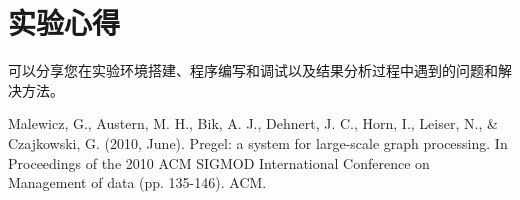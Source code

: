 \documentclass{ML}
\begin{document}
\section{实验心得}
可以分享您在实验环境搭建、程序编写和调试以及结果分析过程中遇到的问题和解决方法。
\appendix

\begin{thebibliography}{20}
     Malewicz, G., Austern, M. H., Bik, A. J., Dehnert, J. C., Horn, I., Leiser, N., \& Czajkowski, G. (2010, June). Pregel: a system for large-scale graph processing. In Proceedings of the 2010 ACM SIGMOD International Conference on Management of data (pp. 135-146). ACM.
\end{thebibliography}
\end{document}
